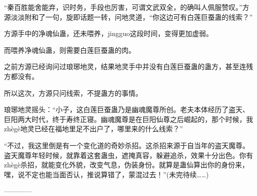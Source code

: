 \begin{this_body}
“秦百胜能舍能弃，识时务，手段也厉害，可谓文武双全，的确叫人佩服赞叹。”方源淡淡附和了一句，旋即话题一转，问地灵道，“你这边可有白莲巨蚕蛊的线索？”

方源手中的净魂仙蛊，还未喂养，jingguo这段时间，变得更加虚弱。

而喂养净魂仙蛊，则需要白莲巨蚕蛊的肉。

之前方源已经询问过琅琊地灵，结果地灵手中并没有白莲巨蚕蛊的蛊方，甚至连残方都没有。

所以这次，方源只问线索，不提蛊方的事情。

琅琊地灵摇头：“小子，这白莲巨蚕蛊乃是幽魂魔尊所创。老夫本体经历了盗天、巨阳两大时代，终于寿终正寝。幽魂魔尊是在巨阳仙尊之后崛起的，那个时候，我zhègè地灵已经在福地里足不出户了，哪里来的什么线索？”

“不过，我这里倒是有一个变化道的奇妙杀招。这杀招来源于自当年的盗天魔尊。盗天魔尊年轻时候，就靠着这套蛊虫，遮掩真容，躲避追杀，效果十分出色。你有zhègè杀招，就能变化外貌，改变气息，伪装身份。就算是蛊仙算出你的身份来，嘿，说不定也能当面否认，推说算错了，蒙混过去！”(未完待续……)

------------

\end{this_body}

